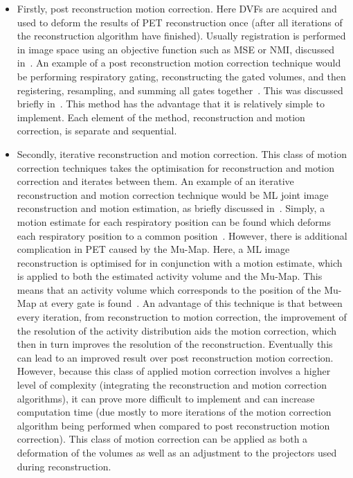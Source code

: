             \begin{itemize}
                \item Firstly, post reconstruction motion correction. Here \glspl{DVF} are acquired and used to deform the results of \gls{PET} reconstruction once (after all iterations of the reconstruction algorithm have finished). Usually registration is performed in image space using an objective function such as \gls{MSE} or \gls{NMI}, discussed in~. An example of a post reconstruction motion correction technique would be performing respiratory gating, reconstructing the gated volumes, and then registering, resampling, and summing all gates together~\parencite{Polycarpou2012AnalysisImaging}. This was discussed briefly in~. This method has the advantage that it is relatively simple to implement. Each element of the method, reconstruction and motion correction, is separate and sequential.
                
                \item Secondly, iterative reconstruction and motion correction. This class of motion correction techniques takes the optimisation for reconstruction and motion correction and iterates between them. An example of an iterative reconstruction and motion correction technique would be \gls{ML} joint image reconstruction and motion estimation, as briefly discussed in~. Simply, a motion estimate for each respiratory position can be found which deforms each respiratory position to a common position~\parencite{Manjeshwar2006, Qiao2006}. However, there is additional complication in \gls{PET} caused by the \gls{Mu-Map}. Here, a \gls{ML} image reconstruction is optimised for in conjunction with a motion estimate, which is applied to both the estimated activity volume and the \gls{Mu-Map}. This means that an activity volume which corresponds to the position of the \gls{Mu-Map} at every gate is found~\parencite{Bousse2016a, Bousse2016}. An advantage of this technique is that between every iteration, from reconstruction to motion correction, the improvement of the resolution of the activity distribution aids the motion correction, which then in turn improves the resolution of the reconstruction. Eventually this can lead to an improved result over post reconstruction motion correction. However, because this class of applied motion correction involves a higher level of complexity (integrating the reconstruction and motion correction algorithms), it can prove more difficult to implement and can increase computation time (due mostly to more iterations of the motion correction algorithm being performed when compared to post reconstruction motion correction). This class of motion correction can be applied as both a deformation of the volumes as well as an adjustment to the projectors used during reconstruction.
                

\end{itemize}
